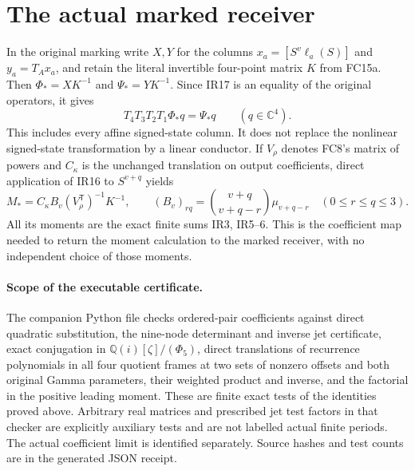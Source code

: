 \documentclass[11pt]{article}
\newcommand{\C}{\mathbb C}
\begin{document}
\section{The actual marked receiver}
In the original marking write $X,Y$ for the columns
$x_a=[S^v\ell_a(S)]$ and $y_a=T_Ax_a$, and retain the literal
invertible four-point matrix $K$ from FC15a. Then
$\Phi_*=XK^{-1}$ and $\Psi_*=YK^{-1}$. Since IR17 is an equality
of the original operators, it gives
\[
 T_4T_3T_2T_1\Phi_*q=\Psi_*q\qquad(q\in\C^4).
 \tag{IR26}
\]
This includes every affine signed-state column. It does not replace
the nonlinear signed-state transformation by a linear conductor.
If $V_\rho$ denotes FC8's matrix of powers and $C_\kappa$ is the
unchanged translation on output coefficients, direct application
of IR16 to $S^{v+q}$ yields
\[
 M_*=C_\kappa B_v(V_\rho^{\mathsf T})^{-1}K^{-1},\qquad
 (B_v)_{rq}=\binom{v+q}{v+q-r}\mu_{v+q-r}
 \quad(0\le r\le q\le3).
 \tag{IR27}
\]
All its moments are the exact finite sums IR3, IR5--6. This is the
coefficient map needed to return the moment calculation to the
marked receiver, with no independent choice of those moments.

\paragraph{Scope of the executable certificate.}
The companion Python file checks ordered-pair coefficients against
direct quadratic substitution, the nine-node determinant and inverse
jet certificate, exact conjugation in $\mathbb Q(i)[\zeta]/(\Phi_5)$,
direct translations of recurrence polynomials in all four quotient
frames at two sets of nonzero offsets and both original Gamma
parameters, their weighted product and inverse, and the factorial
in the positive leading moment. These are finite exact tests of the
identities proved above. Arbitrary real matrices and prescribed jet
test factors in that checker are explicitly auxiliary tests and
are not labelled actual finite periods. The actual coefficient limit
is identified separately. Source hashes and test counts are in the
generated JSON receipt.
\end{document}
